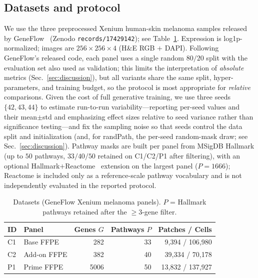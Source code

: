 \documentclass[journal]{IEEEtran}
\begin{document}
\subsection{Datasets and protocol}
We use the three preprocessed Xenium human-skin melanoma samples released by
GeneFlow~\cite{geneflow} (Zenodo \texttt{records/17429142}); see
Table~\ref{tab:datasets}. Expression is log1p-normalized; images are
$256\times256\times4$ (H\&E RGB $+$ DAPI). Following GeneFlow's released code, each
panel uses a single random $80/20$ split with the evaluation set also used as
validation; this limits the interpretation of \emph{absolute} metrics
(Sec.~\ref{sec:discussion}), but all variants share the same split, hyper-parameters,
and training budget, so the protocol is most appropriate for \emph{relative}
comparisons. Given the cost of full generative training, we use three seeds
$\{42,43,44\}$ to estimate run-to-run variability---reporting per-seed values and
their mean$\pm$std and emphasizing effect sizes relative to seed variance rather
than significance testing---and fix the sampling noise so that seeds control the
data split and initialization (and, for randPath, the per-seed random-mask draw;
see Sec.~\ref{sec:discussion}). Pathway masks are built per
panel from MSigDB Hallmark (up to $50$ pathways, $33/40/50$ retained on C1/C2/P1
after filtering), with an optional Hallmark$+$Reactome~\cite{reactome} extension on the largest
panel ($P{=}1666$); Reactome is included only as a reference-scale pathway
vocabulary and is not independently evaluated in the reported protocol.

\begin{table}[t]
\centering
\caption{Datasets (GeneFlow Xenium melanoma panels). $P$ = Hallmark pathways retained after the $\geq 3$-gene filter.}
\label{tab:datasets}
\renewcommand{\arraystretch}{1.2}
\begin{tabular}{@{}llrrr@{}}
\toprule
ID & Panel & Genes $G$ & Pathways $P$ & Patches / Cells \\
\midrule
C1 & Base FFPE       & 282  & 33 & 9{,}394 / 106{,}980 \\
C2 & Add-on FFPE     & 382  & 40 & 39{,}334 / 70{,}178 \\
P1 & Prime FFPE      & 5006 & 50 & 13{,}832 / 137{,}927 \\
\bottomrule
\end{tabular}
\end{table}
\end{document}
